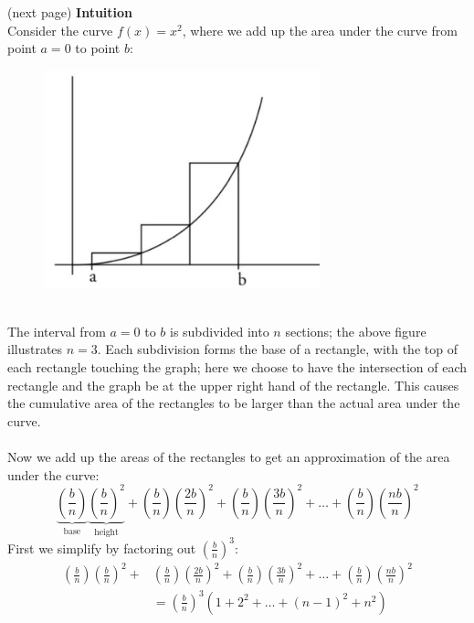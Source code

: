 \documentclass{report}
\begin{document}
(next page)
\newpage
\noindent\textbf{Intuition}\\
Consider the curve $f(x)=x^2$, where we add up the area under
the curve from point $a=0$ to point $b$:
\begin{figure}[h]
\includegraphics[width=8cm]{Capture27}\\
\centering
{}
\end{figure}\\
The interval from $a=0$ to $b$ is subdivided into $n$ sections; the above figure illustrates $n=3$. 
Each subdivision forms the base of a rectangle, with the top of each rectangle touching the graph;
here we choose to have the intersection of each rectangle and the graph be at the
upper right hand of the rectangle. This causes the cumulative area of the rectangles
to be larger than the actual area under the curve.\\
\vspace{1mm}\\
Now we add up the areas of the rectangles to get an
approximation of the area under the curve:
\begin{equation*}
\underbrace{\left(\frac{b}{n}\right)}_{\text{base}}
\underbrace{\left(\frac{b}{n}\right)^2}_{\text{height}}
+\left(\frac{b}{n}\right)\left(\frac{2b}{n}\right)^2
+\left(\frac{b}{n}\right)\left(\frac{3b}{n}\right)^2
+\ldots+\left(\frac{b}{n}\right)\left(\frac{nb}{n}\right)^2
\end{equation*}
First we simplify by factoring out $\left(\frac{b}{n}\right)^3$:
\begin{align*}
\left(\frac{b}{n}\right)\left(\frac{b}{n}\right)^2+&
\left(\frac{b}{n}\right)\left(\frac{2b}{n}\right)^2+
\left(\frac{b}{n}\right)\left(\frac{3b}{n}\right)^2+
\ldots+\left(\frac{b}{n}\right)\left(\frac{nb}{n}\right)^2\\
&=\left(\frac{b}{n}\right)^3(1+2^2+\ldots+(n-1)^2+n^2)
\end{align*}
\end{document}
